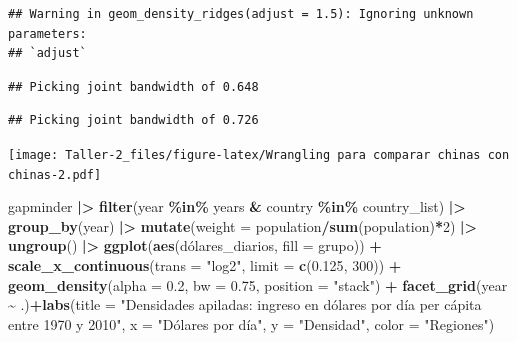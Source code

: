 \documentclass[
]{article}
\newenvironment{Shaded}{\begin{snugshade}}{\end{snugshade}}
\newcommand{\AttributeTok}[1]{\textcolor[rgb]{0.13,0.29,0.53}{#1}}
\newcommand{\DecValTok}[1]{\textcolor[rgb]{0.00,0.00,0.81}{#1}}
\newcommand{\FloatTok}[1]{\textcolor[rgb]{0.00,0.00,0.81}{#1}}
\newcommand{\FunctionTok}[1]{\textcolor[rgb]{0.13,0.29,0.53}{\textbf{#1}}}
\newcommand{\NormalTok}[1]{#1}
\newcommand{\SpecialCharTok}[1]{\textcolor[rgb]{0.81,0.36,0.00}{\textbf{#1}}}
\newcommand{\StringTok}[1]{\textcolor[rgb]{0.31,0.60,0.02}{#1}}
\begin{document}
\begin{verbatim}
## Warning in geom_density_ridges(adjust = 1.5): Ignoring unknown parameters:
## `adjust`
\end{verbatim}

\begin{verbatim}
## Picking joint bandwidth of 0.648
\end{verbatim}

\begin{verbatim}
## Picking joint bandwidth of 0.726
\end{verbatim}

\texttt{[image: Taller-2\_files/figure-latex/Wrangling para comparar chinas con chinas-2.pdf]}

\begin{Shaded}
\begin{Highlighting}[]
\NormalTok{gapminder }\SpecialCharTok{|\textgreater{}}
  \FunctionTok{filter}\NormalTok{(year }\SpecialCharTok{\%in\%}\NormalTok{ years }\SpecialCharTok{\&}\NormalTok{ country }\SpecialCharTok{\%in\%}\NormalTok{ country\_list) }\SpecialCharTok{|\textgreater{}}
  \FunctionTok{group\_by}\NormalTok{(year) }\SpecialCharTok{|\textgreater{}}
  \FunctionTok{mutate}\NormalTok{(}\AttributeTok{weight =}\NormalTok{ population}\SpecialCharTok{/}\FunctionTok{sum}\NormalTok{(population)}\SpecialCharTok{*}\DecValTok{2}\NormalTok{) }\SpecialCharTok{|\textgreater{}}
  \FunctionTok{ungroup}\NormalTok{() }\SpecialCharTok{|\textgreater{}}
  \FunctionTok{ggplot}\NormalTok{(}\FunctionTok{aes}\NormalTok{(dólares\_diarios, }\AttributeTok{fill =}\NormalTok{ grupo)) }\SpecialCharTok{+}
  \FunctionTok{scale\_x\_continuous}\NormalTok{(}\AttributeTok{trans =} \StringTok{"log2"}\NormalTok{, }\AttributeTok{limit =} \FunctionTok{c}\NormalTok{(}\FloatTok{0.125}\NormalTok{, }\DecValTok{300}\NormalTok{)) }\SpecialCharTok{+}
  \FunctionTok{geom\_density}\NormalTok{(}\AttributeTok{alpha =} \FloatTok{0.2}\NormalTok{, }\AttributeTok{bw =} \FloatTok{0.75}\NormalTok{, }\AttributeTok{position =} \StringTok{"stack"}\NormalTok{) }\SpecialCharTok{+}
  \FunctionTok{facet\_grid}\NormalTok{(year }\SpecialCharTok{\textasciitilde{}}\NormalTok{ .)}\SpecialCharTok{+}\FunctionTok{labs}\NormalTok{(}\AttributeTok{title =} \StringTok{"Densidades apiladas: ingreso en dólares por día per cápita entre 1970 y 2010"}\NormalTok{,}
         \AttributeTok{x =} \StringTok{"Dólares por día"}\NormalTok{, }
         \AttributeTok{y =} \StringTok{"Densidad"}\NormalTok{,}
         \AttributeTok{color =} \StringTok{"Regiones"}\NormalTok{)}
\end{Highlighting}
\end{Shaded}
\end{document}
